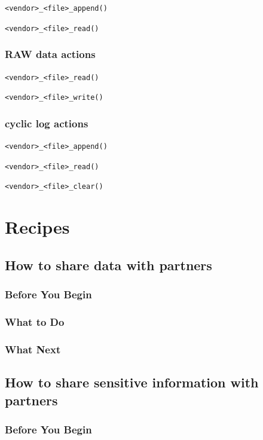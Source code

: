 \documentclass{article}
\begin{document}
\texttt{<vendor>\_<file>\_append()}

\texttt{<vendor>\_<file>\_read()}

\subsubsection{RAW data actions}

\texttt{<vendor>\_<file>\_read()}

\texttt{<vendor>\_<file>\_write()}

\subsubsection{cyclic log actions}

\texttt{<vendor>\_<file>\_append()}

\texttt{<vendor>\_<file>\_read()}

\texttt{<vendor>\_<file>\_clear()}

\section{Recipes}

\subsection{How to share data with partners}

\subsubsection{Before You Begin}

\subsubsection{What to Do}

\subsubsection{What Next}

\subsection{How to share sensitive information with partners}

\subsubsection{Before You Begin}
\end{document}
